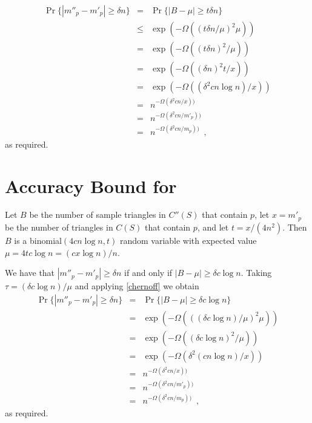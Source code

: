 \documentclass{patmorin}
\begin{document}
\begin{eqnarray*}
   \Pr\{ |m''_p - m'_p| \ge \delta n \} 
   & = & \Pr\{ |B-\mu| \ge t \delta  n \} \\
   & \le & \exp(-\Omega(\left(t \delta  n /\mu\right)^2 \mu)) \\
   &  = & \exp(-\Omega((t \delta  n)^2/\mu)) \\
   &  = & \exp(-\Omega((\delta n)^2 t/x)) \\
   &  = & \exp(-\Omega((\delta^2 cn\log n)/x)) \\
   &  = & n^{-\Omega(\delta^2 cn/x))} \\
   &  = & n^{-\Omega(\delta^2 cn/m'_p))} \\
   &  = & n^{-\Omega(\delta^2 cn/m_p))} \enspace ,
\end{eqnarray*}
as required.

\section{Accuracy Bound for }

Let $B$ be the number of sample triangles in $C''(S)$ that contain $p$,
let $x=m'_p$ be the number of triangles in $C(S)$ that contain $p$, and
let $t=x / (4n^{2})$.  Then $B$ is a binomial$(4cn\log n,t)$ random
variable with expected value $\mu = 4tc\log n = (cx\log n) / n$.

We have that $|m''_p-m'_p|\ge \delta n$ if and only if $|B-\mu|\ge \delta c
\log n$.  Taking $\tau = (\delta c\log n)/\mu$ and applying
\eqref{chernoff} we
obtain
\begin{eqnarray*}
  \Pr\{ |m''_p - m'_p| \ge \delta n \} 
   & = & \Pr\{ |B-\mu| \ge \delta c \log n  \} \\
   & = & \exp(-\Omega(((\delta c\log n) / \mu)^2\mu)) \\
   & = & \exp(-\Omega((\delta c\log n)^2/\mu)) \\
   & = & \exp(-\Omega(\delta^2(cn\log n)/x)) \\
   & = & n^{-\Omega(\delta^2cn/x))} \\
   & = & n^{-\Omega(\delta^2cn/m'_p))} \\
   & = & n^{-\Omega(\delta^2cn/m_p))}  \enspace ,
\end{eqnarray*}
as required.
\end{document}
